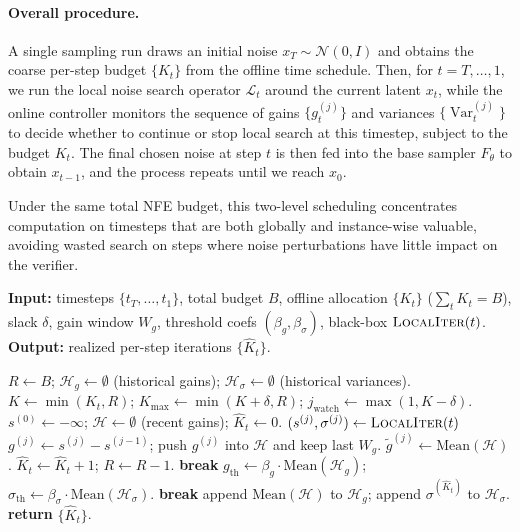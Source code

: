 \paragraph{Overall procedure.}
A single sampling run draws an initial noise $x_T \sim \mathcal{N}(0, I)$ and obtains the
coarse per-step budget $\{K_t\}$ from the offline time schedule.
Then, for $t = T, \dots, 1$, we run the local noise search operator
$\mathcal{L}_t$ around the current latent $x_t$, while the online controller
monitors the sequence of gains $\{g_t^{(j)}\}$ and variances
$\{\operatorname{Var}_t^{(j)}\}$ to decide whether to continue or stop local
search at this timestep, subject to the budget $K_t$.
The final chosen noise at step $t$ is then fed into the base sampler
$F_\theta$ to obtain $x_{t-1}$, and the process repeats until we reach $x_0$.

Under the same total NFE budget, this two-level scheduling concentrates
computation on timesteps that are both globally and instance-wise valuable,
avoiding wasted search on steps where noise perturbations have little
impact on the verifier.

\begin{algorithm}[t]
\caption{GAINS: Global Adaptive Inference-time Noise Scheduling}
\label{alg:offline_online_budget}
\begin{algorithmic}[1]
\STATE \textbf{Input:} timesteps $\{t_T,\dots,t_1\}$, total budget $B$, offline allocation $\{K_t\}$ ($\sum_t K_t=B$),
slack $\delta$, gain window $W_g$, threshold coefs $(\beta_g,\beta_\sigma)$, black-box $\textsc{LocalIter}(t)$.
\STATE \textbf{Output:} realized per-step iterations $\{\widehat K_t\}$.

\STATE $R \leftarrow B$; \quad $\mathcal{H}_g\leftarrow\emptyset$ (historical gains); \quad $\mathcal{H}_\sigma\leftarrow\emptyset$ (historical variances).
    \STATE $K \leftarrow \min(K_t, R)$; \quad $K_{\max}\leftarrow \min(K+\delta, R)$; \quad $j_{\text{watch}}\leftarrow \max(1, K-\delta)$.
    \STATE $s^{(0)} \leftarrow -\infty$; \quad $\mathcal{H}\leftarrow\emptyset$ (recent gains); \quad $\widehat K_t \leftarrow 0$.
        \STATE $(s^{(j)}, \sigma^{(j)}) \leftarrow \textsc{LocalIter}(t)$
        \STATE $g^{(j)} \leftarrow s^{(j)} - s^{(j-1)}$; push $g^{(j)}$ into $\mathcal{H}$ and keep last $W_g$.
        \STATE $\widetilde g^{(j)} \leftarrow \mathrm{Mean}(\mathcal{H})$.
        \STATE $\widehat K_t \leftarrow \widehat K_t + 1$; \quad $R \leftarrow R - 1$.
         \STATE \textbf{break} \ENDIF
            \STATE $g_{\mathrm{th}}\leftarrow \beta_g \cdot \mathrm{Mean}(\mathcal{H}_g)$;\quad
                   $\sigma_{\mathrm{th}}\leftarrow \beta_\sigma \cdot \mathrm{Mean}(\mathcal{H}_\sigma)$.
                \STATE \textbf{break}
            \ENDIF
        \ENDIF
    \ENDFOR
    \STATE append $\mathrm{Mean}(\mathcal{H})$ to $\mathcal{H}_g$; append $\sigma^{(\widehat K_t)}$ to $\mathcal{H}_\sigma$.
\ENDFOR
\STATE \textbf{return} $\{\widehat K_t\}$.
\end{algorithmic}
\end{algorithm}
